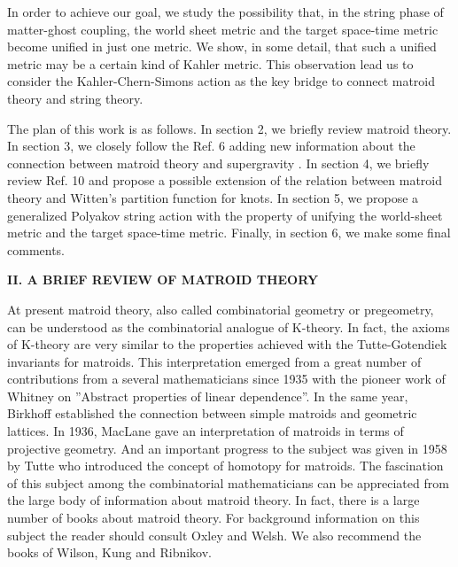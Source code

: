 \documentclass[a4paper,12pt]{article}
\begin{document}
In order to achieve our goal, we study the possibility that, in the string
phase of matter-ghost coupling, the world sheet metric and the target
space-time metric become unified in just one metric. We show, in some
detail, that such a unified metric may be a certain kind of Kahler metric.
This observation lead us to consider the Kahler-Chern-Simons action as the
key bridge to connect matroid theory and string theory.

The plan of this work is as follows. In section 2, we briefly review matroid
theory. In section 3, we closely follow the Ref. 6 adding new information
about the connection between matroid theory and \coordHE{} supergravity . In
section 4, we briefly review Ref. 10 and propose a possible extension of the
relation between matroid theory and Witten's partition function for knots.
In section 5, we propose a generalized Polyakov string action with the
property of unifying the world-sheet metric and the target space-time
metric. Finally, in section 6, we make some final comments. 
\bigskip

\smallskip

\noindent \textbf{II. A BRIEF REVIEW OF MATROID THEORY}

\bigskip

At present matroid theory, also called combinatorial geometry or
pregeometry, can be understood as the combinatorial analogue of K-theory. In
fact, the axioms of K-theory are very similar to the properties achieved
with the Tutte-Gotendiek invariants for matroids. This interpretation
emerged from a great number of contributions from a several mathematicians
since 1935 with the pioneer work of Whitney\coordHE{} on ''Abstract properties
of linear dependence''. In the same year, Birkhoff\coordHE{} established the
connection between simple matroids and geometric lattices. In 1936, MacLane\coordHE{} gave an interpretation of matroids in terms of projective geometry.
And an important progress to the subject was given in 1958 by Tutte\coordHE{}
who introduced the concept of homotopy for matroids. The fascination of this
subject among the combinatorial mathematicians can be appreciated from the
large body of information about matroid theory. In fact, there is a large
number of books about matroid theory. For background information on this
subject the reader should consult Oxley\coordHE{} and Welsh.\coordHE{} We also
recommend the books of Wilson,\coordHE{} Kung\coordHE{} and Ribnikov.\coordHE{}
\end{document}
